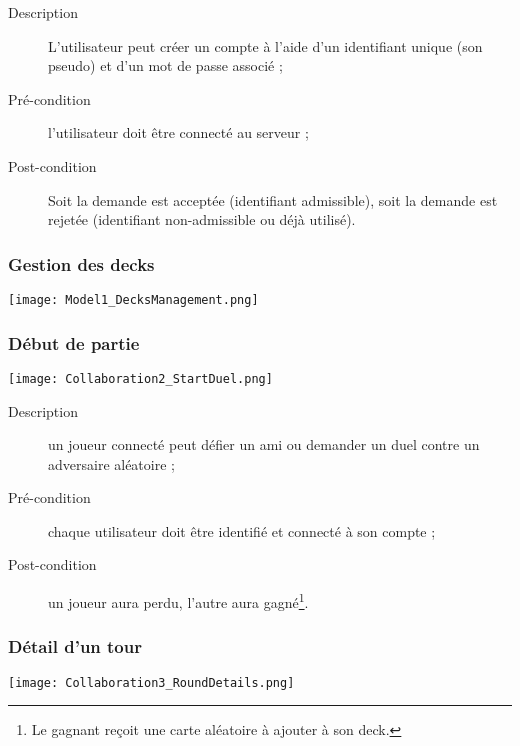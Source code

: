 \documentclass{article}
\begin{document}
            \begin{description}
                \item[Description] L'utilisateur peut créer un compte à l'aide d'un identifiant unique (son pseudo) et d'un mot de passe associé ;
                \item[Pré-condition] l'utilisateur doit être connecté au serveur ;
                \item[Post-condition] Soit la demande est acceptée (identifiant admissible), soit la demande est rejetée (identifiant non-admissible ou déjà utilisé).
            \end{description}

        \subsubsection{Gestion des \glspl{deck}}
            \begin{center}\texttt{[image: Model1\_DecksManagement.png]}\end{center}

        \subsubsection{Début de partie}
            \begin{center}\texttt{[image: Collaboration2\_StartDuel.png]}\end{center}

            \begin{description}
                \item[Description] un joueur connecté peut défier un ami ou demander un duel contre un adversaire aléatoire ;
                \item[Pré-condition] chaque utilisateur doit être identifié et connecté à son compte ;
                \item[Post-condition] un joueur aura perdu, l'autre aura gagné\footnote{Le gagnant reçoit une carte aléatoire à ajouter à son \gls{deck}.}.
            \end{description}

        \subsubsection{Détail d'un tour}
            \begin{center}\texttt{[image: Collaboration3\_RoundDetails.png]}\end{center}
\end{document}
